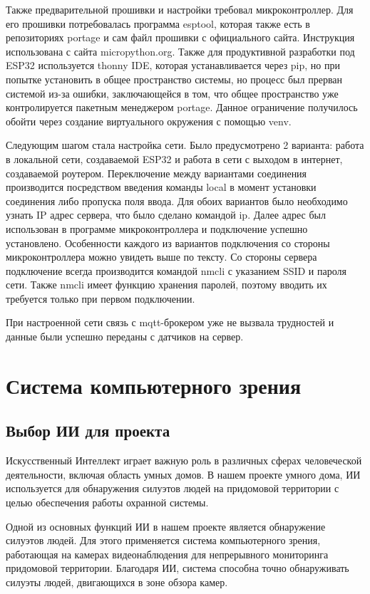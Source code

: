 Также предварительной прошивки и настройки требовал микроконтроллер. Для его прошивки потребовалась программа esptool, которая также есть в репозиториях portage и сам файл прошивки с официального сайта. Инструкция использована с сайта micropython.org. Также для продуктивной разработки под ESP32 используется thonny IDE, которая устанавливается через pip, но при попытке установить в общее пространство системы, но процесс был прерван системой из-за ошибки, заключающейся в том, что общее пространство уже контролируется пакетным менеджером portage. Данное ограничение получилось обойти через создание виртуального окружения с помощью venv.

Следующим шагом стала настройка сети. Было предусмотрено 2 варианта: работа в локальной сети, создаваемой ESP32 и работа в сети с выходом в интернет, создаваемой роутером. Переключение между вариантами соединения производится посредством введения команды local в момент установки соединения либо пропуска поля ввода. Для обоих вариантов было необходимо узнать IP адрес сервера, что было сделано командой ip. Далее адрес был использован в программе микроконтроллера и подключение успешно установлено. Особенности каждого из вариантов подключения со стороны микроконтроллера можно увидеть выше по тексту. Со стороны сервера подключение всегда производится командой nmcli с указанием SSID и пароля сети. Также nmcli имеет функцию хранения паролей, поэтому вводить их требуется только при первом подключении.

При настроенной сети связь с mqtt-брокером уже не вызвала трудностей и данные были успешно переданы с датчиков на сервер.

\chapter{Система компьютерного зрения}

\section{Выбор ИИ для проекта}

Искусственный Интеллект играет важную роль в различных сферах человеческой деятельности, включая область умных домов. В нашем проекте умного дома, ИИ используется для обнаружения силуэтов людей на придомовой территории с целью обеспечения работы охранной системы. 

Одной из основных функций ИИ в нашем проекте является обнаружение силуэтов людей. Для этого применяется система компьютерного зрения, работающая на камерах видеонаблюдения для непрерывного мониторинга придомовой территории. Благодаря ИИ, система способна точно обнаруживать силуэты людей, двигающихся в зоне обзора камер.

